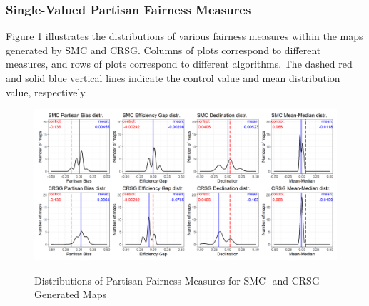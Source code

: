 \subsubsection{Single-Valued Partisan Fairness Measures}

Figure \ref{fig:fair.density} illustrates the distributions of various fairness measures within the maps generated by SMC and CRSG. Columns of plots correspond to different measures, and rows of plots correspond to different algorithms. The dashed red and solid blue vertical lines indicate the control value and mean distribution value, respectively. 

\begin{landscape}
    \begin{figure}[h]
        \caption{Distributions of Partisan Fairness Measures for SMC- and CRSG-Generated Maps}
        \includegraphics{img/fair.density.png}
        \label{fig:fair.density}
        \raggedright
    \end{figure}
\end{landscape}